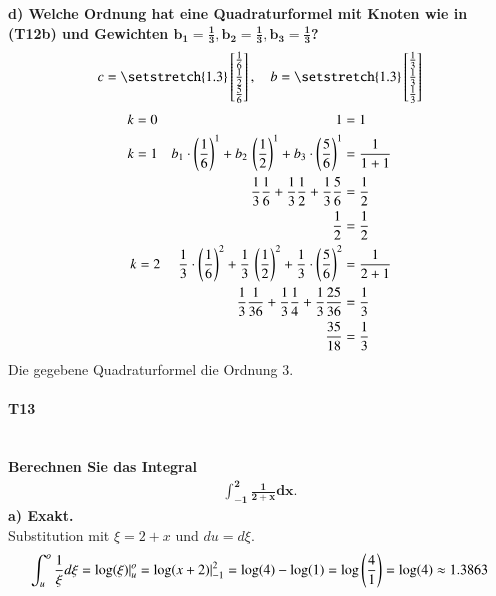 \documentclass[10pt,a4paper]{article}
\begin{document}
    \textbf{%
        d) Welche Ordnung hat eine Quadraturformel mit Knoten wie in (T12b) und Gewichten $\pmb{b_1=\frac{1}{3}, b_2=\frac{1}{3}, b_3=\frac{1}{3}}$?
    }\\
	\begin{align*}
		c = \begingroup %
			\setstretch{1.3}
			\begin{bmatrix}
				\frac{1}{6} \\
				\frac{1}{2} \\
				\frac{5}{6}
			\end{bmatrix}
			\endgroup,  \quad
		b = \begingroup %
			\setstretch{1.3}
			\begin{bmatrix}
				\frac{1}{3} \\
				\frac{1}{3} \\
				\frac{1}{3}
			\end{bmatrix}
			\endgroup
	\end{align*}
	\begin{align*}
		k=0 \hspace{4.5cm}1&=1 \\
		k=1  \quad  b_1\cdot \left( \frac{1}{6}\right)^1+  b_2  \, \left(\frac{1}{2} \right)^1+  b_3\cdot\left( \frac{5}{6}\right)^1 & = \frac{1}{1+1} \\
		\frac{1}{3}\frac{1}{6}+ \frac{1}{3}  \frac{1}{2} + \frac{1}{3} \frac{5}{6}                                                   & = \frac{1}{2} \\
		\frac{1}{2} & = \frac{1}{2} \\
		k=2 \hspace{0.1cm} \quad  \frac{1}{3}\cdot \left( \frac{1}{6}\right)^2+  \frac{1}{3}  \, \left(\frac{1}{2} \right)^2+  \frac{1}{3}\cdot\left( \frac{5}{6}\right)^2 & = \frac{1}{2+1} \\
		\frac{1}{3}\frac{1}{36}+  \frac{1}{3}  \frac{1}{4} + \frac{1}{3} \frac{25}{36} & = \frac{1}{3} \\
		\frac{35}{18} &= \frac{1}{3}
	\end{align*}
	Die gegebene Quadraturformel die Ordnung 3.
    \pagebreak
    \paragraph{T13}\mbox{}\\
    \textbf{%
        Berechnen Sie das Integral
        \begin{align*}
            \pmb{\int_{-1}^{2}\frac{1}{2+x}dx}.
        \end{align*}
        a) Exakt.}\\
        Substitution mit $\xi=2+x$ und $du=d\xi$.
        \begin{align*}
            \int_{u}^{o}\frac{1}{\xi}d\xi = \text{log}(\xi)\arrowvert^o_u = \text{log}(x+2)\arrowvert^2_{-1} = \text{log}(4)-\text{log}(1) = \text{log}\left(\frac{4}{1}\right)=\text{log}(4)\approx1.3863
        \end{align*}
        
\end{document}
